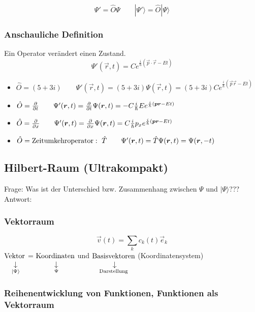 $$\Psi' = \hat O \Psi \qquad |\Psi'\rangle = \hat O | \Psi \rangle$$

\subsubsection{Anschauliche Definition}

Ein Operator verändert einen Zustand.\\
\bei
$$\Psi'(\vec{r},t) = C e^{\frac{i}{\hbar} (\vec{p} \cdot \vec{r} - Et)}$$
\begin{itemize}
	\item $\hat O = (5 + 3i) \qquad \Psi'(\vec{r}, t) = (5 + 3i) \Psi(\vec{r},t) = (5 +3i)C e^{\frac{i}{\hbar}(\vec{p}\vec{r}- Et)}$
	\item $\hat O = \frac{\partial }{\partial t} \qquad \Psi'(\bm{r}, t) = \frac{\partial }{\partial t}\Psi(\bm{r},t) = -C\frac{i}{\hbar}E e^{\frac{i}{\hbar}(\bm{p}\bm{r}- Et)}$
	\item $\hat O = \frac{\partial }{\partial x} \qquad \Psi'(\bm{r}, t) = \frac{\partial }{\partial x} \Psi(\bm{r},t) = C\frac{i}{\hbar}p_x e^{\frac{i}{\hbar}(\bm{p}\bm{r}- Et)}$
	\item $\hat O = \tx{Zeitumkehroperator}:\ \hat T \qquad \Psi'(\vec{r}, t) = \hat T \Psi(\vec{r},t) = \Psi(\vec{r},-t)$
\end{itemize}
\subsection{Hilbert-Raum (Ultrakompakt)}
Frage: Was ist der Unterschied bzw. Zusammenhang zwischen $\Psi$ und $|\Psi\rangle$???\\
Antwort:
\subsubsection{Vektorraum}
$$\vec{v}(t) = \sum_k c_k (t) \vec{e}_k$$
$\custo{\rightarrow}{\tx{Vektor}}{\ |\Psi\rangle}$ = $\custo{\rightarrow}{\tx{Koordinaten}}{\ \Psi}$ und $\custo{\rightarrow}{\tx{Basisvektoren}}{\tx{Darstellung}}$ (Koordinatensystem) 

\subsubsection{Reihenentwicklung von Funktionen, Funktionen als Vektorraum}

